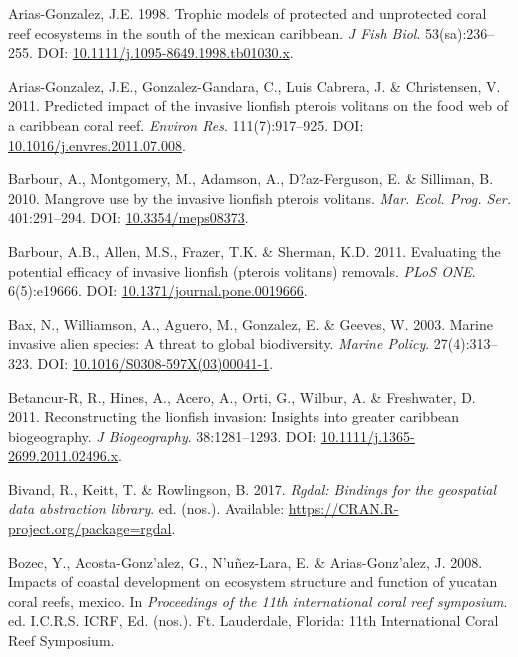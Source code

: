 \documentclass[12pt,]{article}
\begin{document}
\hypertarget{ref-ariasgonzalez_1998}{}
Arias-Gonzalez, J.E. 1998. Trophic models of protected and unprotected
coral reef ecosystems in the south of the mexican caribbean. \emph{J
Fish Biol}. 53(sa):236--255. DOI:
\href{https://doi.org/10.1111/j.1095-8649.1998.tb01030.x}{10.1111/j.1095-8649.1998.tb01030.x}.

\hypertarget{ref-ariasgonzalez_2011}{}
Arias-Gonzalez, J.E., Gonzalez-Gandara, C., Luis Cabrera, J. \&
Christensen, V. 2011. Predicted impact of the invasive lionfish pterois
volitans on the food web of a caribbean coral reef. \emph{Environ Res}.
111(7):917--925. DOI:
\href{https://doi.org/10.1016/j.envres.2011.07.008}{10.1016/j.envres.2011.07.008}.

\hypertarget{ref-barbour_2010}{}
Barbour, A., Montgomery, M., Adamson, A., D?az-Ferguson, E. \& Silliman,
B. 2010. Mangrove use by the invasive lionfish pterois volitans.
\emph{Mar. Ecol. Prog. Ser.} 401:291--294. DOI:
\href{https://doi.org/10.3354/meps08373}{10.3354/meps08373}.

\hypertarget{ref-barbour_2011}{}
Barbour, A.B., Allen, M.S., Frazer, T.K. \& Sherman, K.D. 2011.
Evaluating the potential efficacy of invasive lionfish (pterois
volitans) removals. \emph{PLoS ONE}. 6(5):e19666. DOI:
\href{https://doi.org/10.1371/journal.pone.0019666}{10.1371/journal.pone.0019666}.

\hypertarget{ref-bax_2003}{}
Bax, N., Williamson, A., Aguero, M., Gonzalez, E. \& Geeves, W. 2003.
Marine invasive alien species: A threat to global biodiversity.
\emph{Marine Policy}. 27(4):313--323. DOI:
\href{https://doi.org/10.1016/S0308-597X(03)00041-1}{10.1016/S0308-597X(03)00041-1}.

\hypertarget{ref-betancurr_2011}{}
Betancur-R, R., Hines, A., Acero, A., Orti, G., Wilbur, A. \&
Freshwater, D. 2011. Reconstructing the lionfish invasion: Insights into
greater caribbean biogeography. \emph{J Biogeography}. 38:1281--1293.
DOI:
\href{https://doi.org/10.1111/j.1365-2699.2011.02496.x}{10.1111/j.1365-2699.2011.02496.x}.

\hypertarget{ref-rgdal_2017}{}
Bivand, R., Keitt, T. \& Rowlingson, B. 2017. \emph{Rgdal: Bindings for
the geospatial data abstraction library}. ed. (nos.). Available:
\url{https://CRAN.R-project.org/package=rgdal}.

\hypertarget{ref-bozec_2008}{}
Bozec, Y., Acosta-Gonz\a'alez, G., N\a'uñez-Lara, E. \&
Arias-Gonz\a'alez, J. 2008. Impacts of coastal development on ecosystem
structure and function of yucatan coral reefs, mexico. In
\emph{Proceedings of the 11th international coral reef symposium}. ed.
I.C.R.S. ICRF, Ed. (nos.). Ft. Lauderdale, Florida: 11th International
Coral Reef Symposium.
\end{document}
